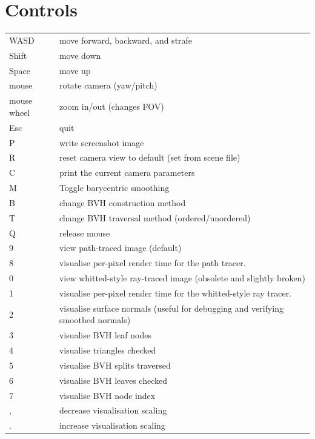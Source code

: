 \section{Controls}
    \begin{tabular}{ll}
    \hline
    WASD & move forward, backward, and strafe \\
    Shift & move down \\
    Space & move up \\
    mouse & rotate camera (yaw/pitch) \\
    mouse wheel & zoom in/out (changes FOV) \\
    \hline
    Esc & quit \\
    P   & write screenshot image \\
    R   & reset camera view to default (set from scene file) \\
    C   & print the current camera parameters \\
    M   & Toggle barycentric smoothing \\
    B   & change BVH construction method \\
    T   & change BVH traversal method (ordered/unordered) \\
    Q   & release mouse \\
    \hline
    9   & view path-traced image (default) \\
    8   & visualise per-pixel render time for the path tracer. \\
    0   & view whitted-style ray-traced image (obsolete and slightly broken) \\
    1   & visualise per-pixel render time for the whitted-style ray tracer. \\
    2   & visualise surface normals (useful for debugging and verifying smoothed normals) \\
    3   & visualise BVH leaf nodes \\
    4   & visualise triangles checked \\
    5   & visualise BVH splits traversed \\
    6   & visualise BVH leaves checked  \\
    7   & visualise BVH node index \\
    ,   & decrease visualisation scaling \\
    .   & increase visualisation scaling \\
    \hline
    \end{tabular}

